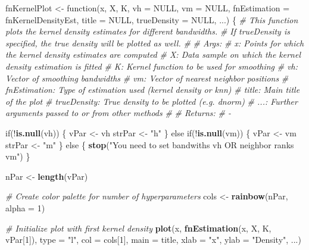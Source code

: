 \documentclass[10pt,]{article}
\newenvironment{Shaded}{\begin{snugshade}}{\end{snugshade}}
\newcommand{\KeywordTok}[1]{\textcolor[rgb]{0.13,0.29,0.53}{\textbf{{#1}}}}
\newcommand{\DataTypeTok}[1]{\textcolor[rgb]{0.13,0.29,0.53}{{#1}}}
\newcommand{\DecValTok}[1]{\textcolor[rgb]{0.00,0.00,0.81}{{#1}}}
\newcommand{\StringTok}[1]{\textcolor[rgb]{0.31,0.60,0.02}{{#1}}}
\newcommand{\CommentTok}[1]{\textcolor[rgb]{0.56,0.35,0.01}{\textit{{#1}}}}
\newcommand{\OtherTok}[1]{\textcolor[rgb]{0.56,0.35,0.01}{{#1}}}
\newcommand{\NormalTok}[1]{{#1}}
\begin{document}
\begin{Shaded}
\begin{Highlighting}[]
\NormalTok{fnKernelPlot <-}\StringTok{ }\NormalTok{function(x, X, K, }\DataTypeTok{vh =} \OtherTok{NULL}\NormalTok{, }\DataTypeTok{vm =} \OtherTok{NULL}\NormalTok{,}
                         \DataTypeTok{fnEstimation =} \NormalTok{fnKernelDensityEst,}
                         \DataTypeTok{title =} \OtherTok{NULL}\NormalTok{, }\DataTypeTok{trueDensity =} \OtherTok{NULL}\NormalTok{, ...) \{}
  \CommentTok{# This function plots the kernel density estimates for different bandwidths.}
  \CommentTok{# If trueDensity is specified, the true density will be plotted as well.}
  \CommentTok{# }
  \CommentTok{# Args:}
  \CommentTok{#   x:            Points for which the kernel density estimates are computed}
  \CommentTok{#   X:            Data sample on which the kernel density estimation is fitted}
  \CommentTok{#   K:            Kernel function to be used for smoothing}
  \CommentTok{#   vh:           Vector of smoothing bandwidths}
  \CommentTok{#   vm:           Vector of nearest neighbor positions}
  \CommentTok{#   fnEstimation: Type of estimation used (kernel density or knn)}
  \CommentTok{#   title:        Main title of the plot}
  \CommentTok{#   trueDensity:  True density to be plotted (e.g. dnorm)}
  \CommentTok{#   ...:          Further arguments passed to or from other methods}
  \CommentTok{#   }
  \CommentTok{# Returns:}
  \CommentTok{#   -}
  
  \NormalTok{if(!}\KeywordTok{is.null}\NormalTok{(vh)) \{}
    \NormalTok{vPar <-}\StringTok{ }\NormalTok{vh}
    \NormalTok{strPar <-}\StringTok{ "h"}
  \NormalTok{\} else if(!}\KeywordTok{is.null}\NormalTok{(vm)) \{}
    \NormalTok{vPar <-}\StringTok{  }\NormalTok{vm}
    \NormalTok{strPar <-}\StringTok{ "m"}
  \NormalTok{\} else \{}
    \KeywordTok{stop}\NormalTok{(}\StringTok{"You need to set bandwiths vh OR neighbor ranks vm"}\NormalTok{)}
  \NormalTok{\}}
  
  \NormalTok{nPar <-}\StringTok{ }\KeywordTok{length}\NormalTok{(vPar)}
  
  \CommentTok{# Create color palette for number of hyperparameters}
  \NormalTok{cols <-}\StringTok{ }\KeywordTok{rainbow}\NormalTok{(nPar, }\DataTypeTok{alpha =} \DecValTok{1}\NormalTok{)}
  
  \CommentTok{# Initialize plot with first kernel density}
  \KeywordTok{plot}\NormalTok{(x, }\KeywordTok{fnEstimation}\NormalTok{(x, X, K, vPar[}\DecValTok{1}\NormalTok{]), }\DataTypeTok{type =} \StringTok{"l"}\NormalTok{, }\DataTypeTok{col =} \NormalTok{cols[}\DecValTok{1}\NormalTok{], }
       \DataTypeTok{main =} \NormalTok{title, }\DataTypeTok{xlab =} \StringTok{"x"}\NormalTok{, }\DataTypeTok{ylab =} \StringTok{"Density"}\NormalTok{, ...)}
  

\end{Highlighting}
\end{Shaded}
\end{document}

